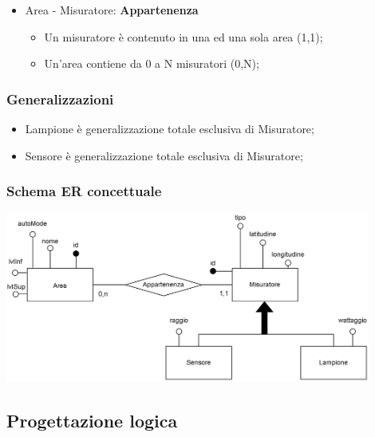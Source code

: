 \begin{itemize}

    \item Area - Misuratore: \textbf{Appartenenza}
    \begin{itemize}
        \item Un misuratore è contenuto in una ed una sola area (1,1);
        \item Un'area contiene da 0 a N misuratori (0,N);
    \end{itemize}
    
\end{itemize}

\subsubsection{Generalizzazioni}

\begin{itemize}
    \item Lampione è generalizzazione totale esclusiva di Misuratore;
    \item Sensore è generalizzazione totale esclusiva di Misuratore;
\end{itemize}

\subsubsection{Schema ER concettuale}

\begin{center}
    \includegraphics[width=12cm]{contenuti/specifica-basi-dati/img-sbd/anagrafica_concettuale.png}
\end{center}

\subsection{Progettazione logica}
